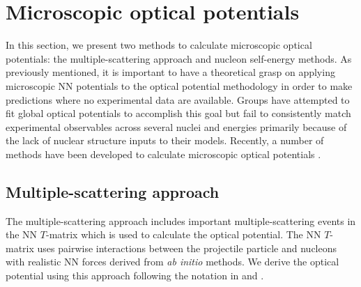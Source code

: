 \documentclass[preprintnumbers,floatfix,aps,prc,preprint,nofootinbib]{revtex4-1}
\begin{document}
\section{Microscopic optical potentials}
\label{sec:microscopic}


In this section, we present two methods to calculate microscopic optical potentials: the multiple-scattering approach and nucleon self-energy methods. As previously mentioned, it is important to have a theoretical grasp on applying microscopic NN potentials to the optical potential methodology in order to make predictions where no experimental data are available. Groups have attempted to fit global optical potentials to accomplish this goal but fail to consistently match experimental observables across several nuclei and energies primarily because of the lack of nuclear structure inputs to their models. Recently, a number of methods have been developed to calculate microscopic optical potentials \cite{Furumoto:2019anr, Idini:2019hkq, Rotureau:2016jpf}.


\subsection{Multiple-scattering approach}
\label{sec:multiple_scattering}


The multiple-scattering approach includes important multiple-scattering events in the NN $T$-matrix which is used to calculate the optical potential. The NN $T$-matrix uses pairwise interactions between the projectile particle and nucleons with realistic NN forces derived from \textit{ab initio} methods. We derive the optical potential using this approach following the notation in \cite{Dickhoff:2018wdd} and \cite{Burrows:2018ggt}.
\\
\end{document}
